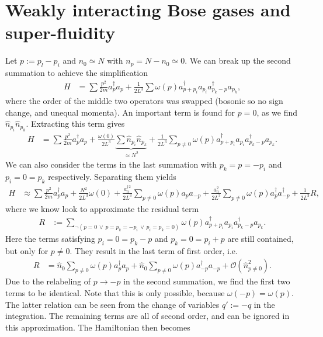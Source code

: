 \documentclass[english, parskip=full]{scrartcl}
\begin{document}
\section{Weakly interacting Bose gases and super-fluidity}
Let $p:=p_l-p_i$ and $n_0\simeq N$ with $n_p=N-n_0\simeq 0$. 
We can break up the second summation to achieve the simplification
\begin{align}
H&=\sum\frac{p^2}{2m}a_p^\dagger a_p+\frac{1}{2L^3}\sum\omega(p)a_{p+p_i}^\dagger  a_{p_i}a_{p_k-p}^\dagger a_{p_k},
\end{align}
where the order of the middle two operators was swapped (bosonic so no sign change, and unequal momenta). 
An important term is found for $p=0$, as we find $\hat{n}_{p_i}\hat{n}_{p_k}$. 
Extracting this term gives
\begin{align}
H&=\sum\frac{p^2}{2m}a_p^\dagger a_p+\frac{\omega (0)}{2L^3}\underbrace{\sum\hat{n}_{p_i}\hat{n}_{p_k}}_{\approx N^2}+\frac{1}{2L^3}\sum_{p\neq 0}\omega (p)a_{p+p_i}^\dagger  a_{p_i}a_{p_k-p}^\dagger a_{p_k}.
\end{align}
We can also consider the terms in the last summation with $p_k=p=-p_i$ and $p_i=0=p_k$ respectively. 
Separating them yields
\begin{align}
H&\approx \sum\frac{p^2}{2m}a_p^\dagger a_p+\frac{N^2}{2L^3}\omega (0)+\frac{a_0^{\dagger 2}}{2L^3}\sum_{p\neq 0}\omega (p) a_pa_{-p}+\frac{a_0^2}{2L^3}\sum_{p\neq 0}\omega (p) a_p^\dagger a_{-p}^\dagger+\frac{1}{2L^3}R,
\end{align}
where we know look to approximate the residual term 
\begin{align}
R&:=\sum_{\neg (p=0\,\lor\, p=p_k=-p_i\,\lor\, p_i=p_k=0)}\omega (p)a_{p+p_i}^\dagger  a_{p_i}a_{p_k-p}^\dagger a_{p_k}.
\end{align}
Here the terms satisfying $p_i=0=p_k-p$ and $p_k=0=p_i+p$ are still contained, but only for $p\neq 0$.
They result in the last term of first order, i.e.
\begin{align}
R&=\hat{n}_0\sum_{p\neq 0}\omega (p) a_p^\dagger a_p + \hat{n}_0\sum_{p\neq 0}\omega (p) a_{-p}^\dagger a_{-p}+\mathcal{O}(\hat{n}_{p\neq 0}^2).
\end{align}
Due to the relabeling of $p\rightarrow -p$ in the second summation, we find the first two terms to be identical.
Note that this is only possible, because $\omega (-p) = \omega (p)$.
The latter relation can be seen from the change of variables $q':=-q$ in the integration.
The remaining terms are all of second order, and can be ignored in this approximation.
The Hamiltonian then becomes
\end{document}
